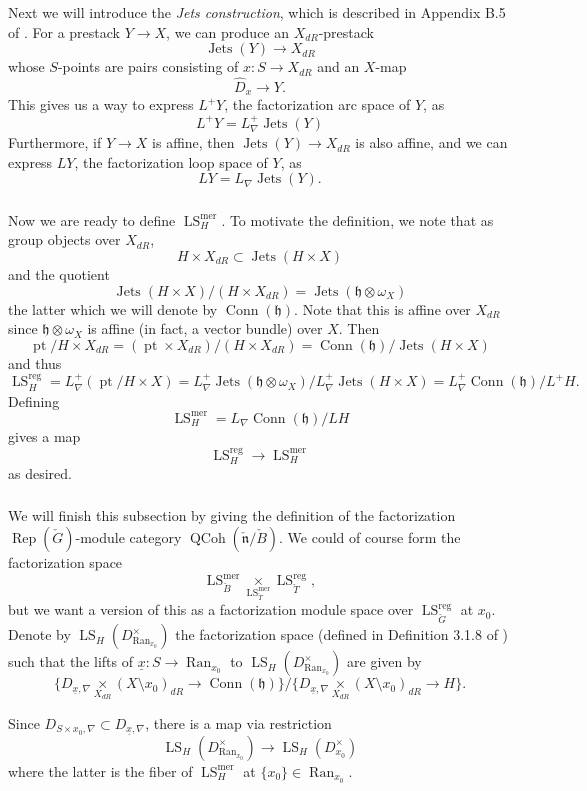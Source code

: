\documentclass[10pt,a4paper]{amsart}
\newcommand{\on}[1]{\operatorname{#1}}
\newcommand{\Gcheck}{\check{G}}
\newcommand{\ncheck}{\check{\mathfrak{n}}}
\newcommand{\Bcheck}{\check{B}}
\newcommand{\Tcheck}{\check{T}}
\newcommand{\Ran}{\on{Ran}}
\newcommand{\sssec}[1]{\subsubsection{}}
\begin{document}
\sssec{}
Next we will introduce the \emph{Jets construction}, which is described in Appendix B.5 of \cite{GLC2}. For a prestack $Y \to X$, we can produce an $X_{dR}$-prestack
$$
\on{Jets}(Y) \to X_{dR}
$$
whose $S$-points are pairs consisting of $x: S \to X_{dR}$ and an $X$-map
$$
\hat{D}_{x} \to Y.
$$
This gives us a way to express $L^+Y$, the factorization arc space of $Y$, as
$$
L^+Y = L_{\nabla}^+\on{Jets}(Y)
$$
Furthermore, if $Y \to X$ is affine, then $\on{Jets}(Y) \to X_{dR}$ is also affine, and we can express $LY$, the factorization loop space of $Y$, as
$$
LY = L_{\nabla} \on{Jets}(Y).
$$

\sssec{}
Now we are ready to define $\on{LS}_{H}^{\on{mer}}$. To motivate the definition, we note that as group objects over $X_{dR}$,
$$
H \times X_{dR} \subset \on{Jets}(H \times X)
$$
and the quotient
$$
\on{Jets}(H \times X)/(H \times X_{dR}) = \on{Jets}(\mathfrak{h} \otimes \omega_{X})
$$
the latter which we will denote by $\on{Conn}(\mathfrak{h})$. Note that this is affine over $X_{dR}$ since $\mathfrak{h} \otimes \omega_X$ is affine (in fact, a vector bundle) over $X$. Then
$$
\on{pt}/H \times X_{dR} = (\on{pt} \times X_{dR})/(H \times X_{dR}) = \on{Conn}(\mathfrak{h})/\on{Jets}(H \times X)
$$
and thus
$$
\on{LS}_{H}^{\on{reg}} = L_{\nabla}^+(\on{pt}/H \times X) = L_{\nabla}^+\on{Jets}(\mathfrak{h} \otimes \omega_{X})/L_{\nabla}^+\on{Jets}(H \times X) = L_{\nabla}^+\on{Conn}(\mathfrak{h})/L^+H.
$$
Defining
$$
\on{LS}_{H}^{\on{mer}} = L_{\nabla}\on{Conn}(\mathfrak{h})/LH
$$
gives a map
$$
\on{LS}_H^{\on{reg}} \to \on{LS}_{H}^{\on{mer}}
$$
as desired.

\sssec{}
We will finish this subsection by giving the definition of the factorization $\on{Rep}(\check{G})$-module category $\on{QCoh}(\ncheck/\Bcheck)$. We could of course form the factorization space
$$
\on{LS}_{\Bcheck}^{\on{mer}} \underset{\on{LS}_{\Tcheck}^{\on{mer}}}{\times} \on{LS}_{\Tcheck}^{\on{reg}},
$$
but we want a version of this as a factorization module space over $\on{LS}_{\Gcheck}^{\on{reg}}$ at $x_0$. Denote by $\on{LS}_H(D_{\Ran_{x_0}}^{\times})$ the factorization space (defined in Definition 3.1.8 of \cite{Katia}) such that the lifts of $\underline{x}: S \to \on{Ran}_{x_0}$ to $\on{LS}_H(D_{\Ran_{x_0}}^{\times})$ are given by
$$
\{D_{\underline{x}, \nabla} \underset{X_{dR}}{\times} (X \setminus x_0)_{dR} \to \on{Conn}(\mathfrak{h})\}/\{D_{\underline{x}, \nabla} \underset{X_{dR}}{\times} (X \setminus x_0)_{dR} \to H\}.
$$

Since $D_{S \times x_0, \nabla} \subset D_{\underline{x}, \nabla}$, there is a map via restriction
$$
\on{LS}_H(D_{\Ran_{x_0}}^{\times}) \to \on{LS}_H(D_{x_0}^{\times})
$$
where the latter is the fiber of $\on{LS}_H^{\on{mer}}$ at $\{x_0\} \in \Ran_{x_0}$.
\end{document}
